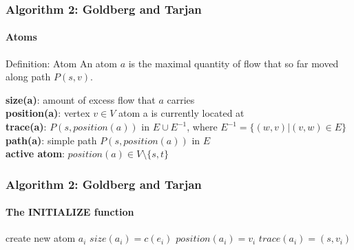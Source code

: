 \documentclass{beamer}
\begin{document}
\begin{frame}
\frametitle{Algorithm 2: Goldberg and Tarjan}
\framesubtitle{Atoms}
\begin{block}{Definition: Atom}
An atom $a$ is the maximal quantity of flow that so far moved along path $P(s,v)$.\\
\end{block}

\textbf{size(a)}: amount of excess flow that $a$ carries \\
\textbf{position(a)}: vertex $v\in V$ atom a is currently located at\\
\textbf{trace(a)}: $P(s, position(a))$ in $E \cup  E^{-1}$, where $E^{-1} = \{(w,v)\vert (v,w) \in E \}$ \\
\textbf{path(a)}: simple path $P(s, position(a))$ in $E$ \\
\textbf{active atom}: $position(a) \in V \setminus \{s, t\}$
\end{frame}

\begin{frame}
\frametitle{Algorithm 2: Goldberg and Tarjan}
\framesubtitle{The INITIALIZE function}
	\begin{algorithmic}[1]
		\State create new atom $a_i$
		\State $size(a_i) = c(e_i)$
		\State $position(a_i) = v_i$
		\State $trace(a_i) = (s,v_i)$		
	\EndFor
	\EndFunction
	\end{algorithmic}
\end{frame}
\end{document}
